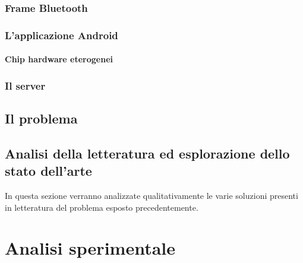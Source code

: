 \documentclass[12pt,twoside]{report}
\begin{document}
	\subsection{Frame Bluetooth}
	
	\subsection{L'applicazione Android}
	\subsubsection{Chip hardware eterogenei}
	
	\subsection{Il server}
	
	\section{Il problema}
	
	\section{Analisi della letteratura ed esplorazione dello stato dell'arte}
	
	In questa sezione verranno analizzate qualitativamente le varie soluzioni presenti in letteratura del problema esposto precedentemente.

\chapter{Analisi sperimentale}


\printbibliography[
heading=bibintoc,
title={Bibliografia}
]
	
	
	
	
\end{document}
